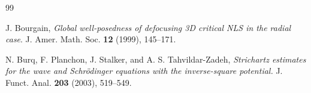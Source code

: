 \documentclass[12pt]{amsart}
\begin{document}
\begin{thebibliography}{99}










 J. Bourgain, \emph{Global well-posedness of
defocusing 3D critical NLS in the radial case}. J. Amer. Math. Soc. \textbf{12} (1999), 145--171.



 N. Burq, F. Planchon, J. Stalker, and A. S.
Tahvildar-Zadeh, \emph{Strichartz estimates for the wave and Schr\"{o}dinger
equations with the inverse-square potential.} J. Funct. Anal. \textbf{203}
(2003), 519--549.


\end{thebibliography}
\end{document}
